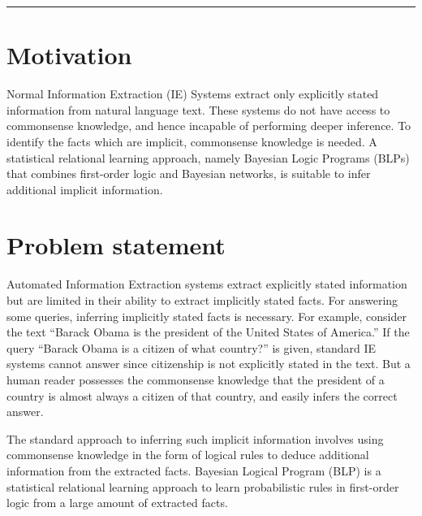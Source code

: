 \documentclass[12pt,a4paper]{article}
\begin{document}
   

\reviewtitle
\hrule

\section{Motivation}
Normal Information Extraction (IE) Systems extract only explicitly
stated information from natural language text. These systems do not
have access to commonsense knowledge, and hence incapable of
performing deeper inference. To identify the facts which are implicit,
commonsense knowledge is needed. A statistical relational learning
approach, namely Bayesian Logic Programs (BLPs) that combines
first-order logic and Bayesian networks, is suitable to infer
additional implicit information.

\section{Problem statement}
Automated Information Extraction systems extract explicitly stated
information but are limited in their ability to extract implicitly
stated facts. For answering some queries, inferring implicitly stated
facts is necessary. For example, consider the text ``Barack Obama is
the president of the United States of America.'' If the query ``Barack
Obama is a citizen of what country?'' is given, standard IE systems
cannot answer since citizenship is not explicitly stated in the
text. But a human reader possesses the commonsense knowledge that the
president of a country is almost always a citizen of that country, and
easily infers the correct answer.

The standard approach to inferring such implicit information involves
using commonsense knowledge in the form of logical rules to deduce
additional information from the extracted facts. Bayesian Logical
Program (BLP) is a statistical relational learning approach to learn
probabilistic rules in first-order logic from a large amount of
extracted facts.
\end{document}
